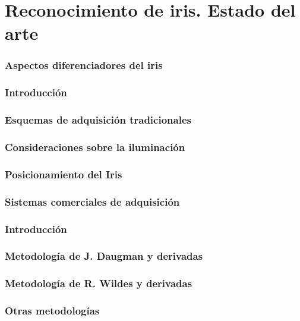 \chapter{Reconocimiento de iris. Estado del arte}
\label{chap:estadodelarte}


 \label{sec:historia}

\label{sec:anatomiaojo}
\subsection{Aspectos diferenciadores del iris}


 \label{sec:adquisicion}
\subsection{Introducción}
\subsection{Esquemas de adquisición tradicionales}
\subsection{Consideraciones sobre la iluminación}
\label{subsec:iluminacion}
\subsection{Posicionamiento del Iris}
\subsection{Sistemas comerciales de adquisición}


 \label{sec:localizacion}
\subsection{Introducción}
\subsection{Metodología de J. Daugman y derivadas}
\subsection{Metodología de R. Wildes y derivadas}
\subsection{Otras metodologías}
